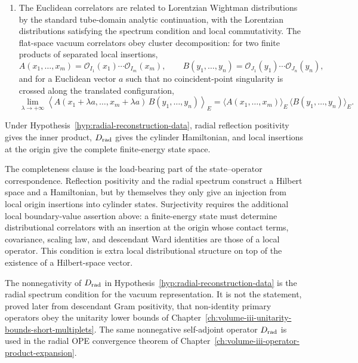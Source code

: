 \begin{hypothesis}
\begin{enumerate}
  existence assertion about distributional extensions at the origin; the
  theorem later in this chapter constructs the corresponding local-operator
  class from such data.
  \item The Euclidean correlators are related to Lorentzian Wightman
  distributions by the standard tube-domain analytic continuation, with the
  Lorentzian distributions satisfying the spectrum condition and local
  commutativity.  The flat-space vacuum correlators obey cluster decomposition:
  for two finite products of separated local insertions,
  \[
    A(x_1,\ldots,x_m)=\mathcal O_{I_1}(x_1)\cdots\mathcal O_{I_m}(x_m),
    \qquad
    B(y_1,\ldots,y_n)=\mathcal O_{J_1}(y_1)\cdots\mathcal O_{J_n}(y_n),
  \]
  and for a Euclidean vector \(a\) such that no coincident-point singularity is
  crossed along the translated configuration,
  \[
    \lim_{\lambda\to+\infty}
    \left\langle
      A(x_1+\lambda a,\ldots,x_m+\lambda a)\,
      B(y_1,\ldots,y_n)
    \right\rangle_E
    =
    \langle A(x_1,\ldots,x_m)\rangle_E\,
    \langle B(y_1,\ldots,y_n)\rangle_E .
  \]
\end{enumerate}
\end{hypothesis}

Under Hypothesis~\ref{hyp:radial-reconstruction-data}, radial reflection
positivity gives the inner product, \(D_{\rm rad}\) gives the cylinder
Hamiltonian, and local insertions at the origin give the complete
finite-energy state space.

The completeness clause is the load-bearing part of the state--operator
correspondence.  Reflection positivity and the radial spectrum construct a
Hilbert space and a Hamiltonian, but by themselves they only give an injection
from local origin insertions into cylinder states.  Surjectivity requires the
additional local boundary-value assertion above: a finite-energy state must
determine distributional correlators with an insertion at the origin whose
contact terms, covariance, scaling law, and descendant Ward identities are
those of a local operator.  This condition is extra local distributional
structure on top of the existence of a Hilbert-space vector.

The nonnegativity of \(D_{\rm rad}\) in
Hypothesis~\ref{hyp:radial-reconstruction-data} is the radial spectrum
condition for the vacuum representation.  It is not the statement, proved
later from descendant Gram positivity, that non-identity primary operators
obey the unitarity lower bounds of
Chapter~\ref{ch:volume-iii-unitarity-bounds-short-multiplets}.  The same
nonnegative self-adjoint operator \(D_{\rm rad}\) is used in the radial OPE
convergence theorem of
Chapter~\ref{ch:volume-iii-operator-product-expansion}.


